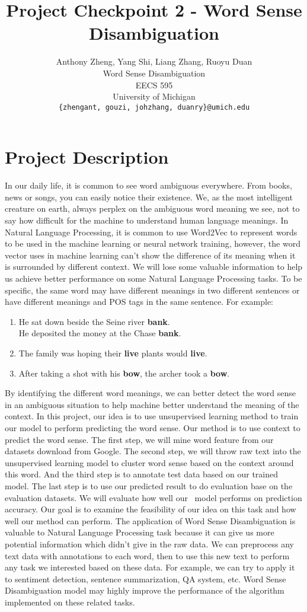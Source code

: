 \documentclass[11pt,letterpaper]{article}
\title{Project Checkpoint 2 - Word Sense Disambiguation}
\author{Anthony Zheng, Yang Shi, Liang Zhang, Ruoyu Duan\\
      Word Sense Disambiguation\\
      EECS 595\\
	    University of Michigan\\
	    {\tt \{zhengant, gouzi, johzhang, duanry\}@umich.edu}
}
\date{}
\begin{document}
\maketitle

\section{Project Description}
In our daily life, it is common to see word ambiguous everywhere. From books, news or songs, you can easily notice their existence. We, as the most intelligent creature on earth, always perplex on the ambiguous word meaning we see, not to say how difficult for the machine to understand human language meanings. In Natural Language Processing, it is common to use Word2Vec to represent words to be used in the machine learning or neural network training, however, the word vector uses in machine learning can’t show the difference of its meaning when it is surrounded by different context. We will lose some valuable information to help us achieve better performance on some Natural Language Processing tasks. To be specific, the same word may have different meanings in two different sentences or have different meanings and POS tags in the same sentence. For example: 
\begin{enumerate}
  \item He sat down beside the Seine river \textbf{bank}.\\
  He deposited the money at the Chase \textbf{bank}.
  \item The family was hoping their \textbf{live} plants would \textbf{live}.
  \item After taking a shot with his \textbf{bow}, the archer took a \textbf{bow}. 
\end{enumerate}
By identifying the different word meanings, we can better detect the word sense in an ambiguous situation to help machine better understand the meaning of the context. In this project, our idea is to use unsupervised learning method to train our model to perform predicting the word sense. Our method is to use context to predict the word sense. The first step, we will mine word feature from our datasets download from Google. The second step, we will throw raw text into the unsupervised learning model to cluster word sense based on the context around this word. And the third step is to annotate test data based on our trained model. The last step is to use our predicted result to do evaluation base on the evaluation datasets. We will evaluate how well our  model performs on prediction accuracy. Our goal is to examine the feasibility of our idea on this task and how well our method can perform. The application of Word Sense Disambiguation is valuable to Natural Language Processing task because it can give us more potential information which didn’t give in the raw data. We can preprocess any text data with annotations to each word, then to use this new text to perform any task we interested based on these data. For example, we can try to apply it to sentiment detection, sentence summarization, QA system, etc. Word Sense Disambiguation model may highly improve the performance of the algorithm implemented on these related tasks. 
\end{document}
